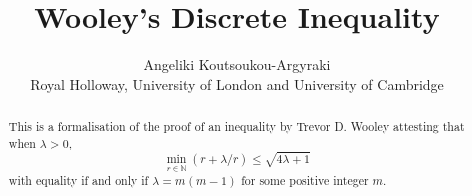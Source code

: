 \documentclass[11pt,a4paper]{article}
\begin{document}
\title{Wooley's Discrete Inequality}
\author{Angeliki Koutsoukou-Argyraki\\Royal Holloway, University of London and University of Cambridge}
\maketitle

\begin{abstract}
  This is a formalisation of the proof of an inequality by Trevor D. Wooley attesting that when 
$\lambda > 0$, $$\min_{r \in \mathbb{N}}(r + \lambda/r) \leq \sqrt{4 \lambda +1}$$
with equality if and only if $\lambda = m(m-1)$ for some positive integer $m$.
\end{abstract}

\tableofcontents





\end{document}

